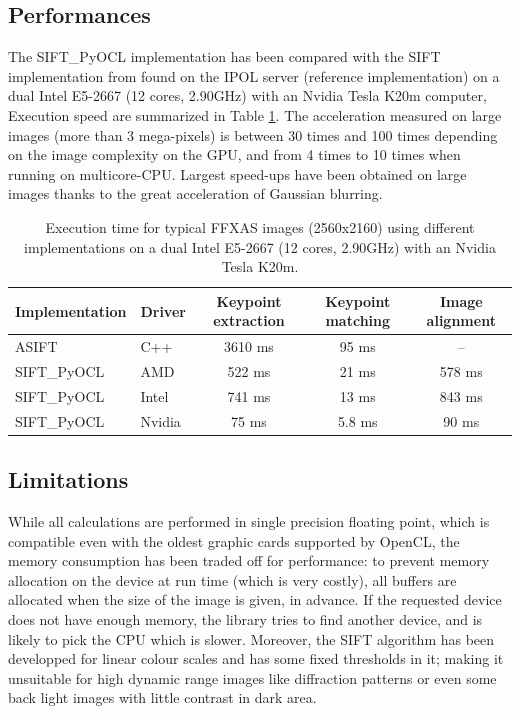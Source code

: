 \documentclass[preprint]{iucr}
\begin{document}
\subsection{Performances}

The SIFT\_PyOCL implementation has been compared with the SIFT
implementation from \cite{ASIFT} found on the IPOL server (reference
implementation) on a dual Intel E5-2667 (12 cores, 2.90GHz) with an Nvidia Tesla
K20m computer, Execution speed are summarized in Table \ref{bench}.
The acceleration measured on large images (more than 3 mega-pixels) is between
30 times and 100 times depending on the image complexity on the GPU, and from 4
times to 10 times when running on multicore-CPU.
Largest speed-ups have been obtained on large images thanks to the
great acceleration of Gaussian blurring.

\begin{table}
\caption{Execution time for typical FFXAS images (2560x2160) using different
implementations on a dual Intel E5-2667 (12 cores, 2.90GHz) with an Nvidia Tesla
K20m.}
\label{bench}
\vspace{1mm}
\begin{center}
\begin{tabular}{l l ccc}
Implementation & Driver & Keypoint extraction & Keypoint matching &
Image alignment\\
\hline
ASIFT        &   C++     &   3610 ms  & 95 ms  & --  \\
SIFT\_PyOCL  &   AMD  &   522 ms  &  21 ms&  578 ms \\
SIFT\_PyOCL  &   Intel  &   741 ms  &  13 ms&  843 ms\\
SIFT\_PyOCL  &   Nvidia  &    75 ms  &  5.8 ms & 90 ms\\
\end{tabular}
\end{center}
\end{table}



\subsection{Limitations}
While all calculations are performed in single precision floating point,
which is compatible even with the oldest graphic cards supported by OpenCL, the
memory consumption has been traded off for performance: to prevent memory
allocation on the device at run time (which is very costly), all buffers are
allocated when the size of the image is given, in advance. If the
requested device does not have enough memory, the library tries to find another
device, and is likely to pick the CPU which is slower.
Moreover, the SIFT algorithm has been developped for linear colour scales and
has some fixed thresholds in it; making it unsuitable for high dynamic
range images like diffraction patterns or even some back light images with
little contrast in dark area.
\end{document}
